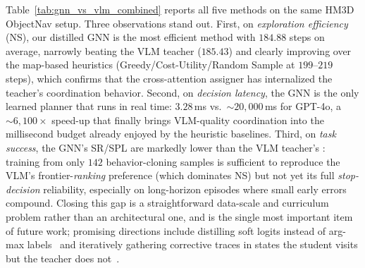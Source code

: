 Table~\ref{tab:gnn_vs_vlm_combined} reports all five methods on the same HM3D ObjectNav setup. Three observations stand out. First, on \emph{exploration efficiency} (NS), our distilled GNN is the most efficient method with $184.88$ steps on average, narrowly beating the VLM teacher ($185.43$) and clearly improving over the map-based heuristics (Greedy/Cost-Utility/Random Sample at $199$--$219$ steps), which confirms that the cross-attention assigner has internalized the teacher's coordination behavior. Second, on \emph{decision latency}, the GNN is the only learned planner that runs in real time: $3.28$\,ms vs.\ ${\sim}20{,}000$\,ms for GPT-4o, a ${\sim}6{,}100\times$ speed-up that finally brings VLM-quality coordination into the millisecond budget already enjoyed by the heuristic baselines. Third, on \emph{task success}, the GNN's SR/SPL are markedly lower than the VLM teacher's : training from only $142$ behavior-cloning samples is sufficient to reproduce the VLM's frontier-\emph{ranking} preference (which dominates NS) but not yet its full \emph{stop-decision} reliability, especially on long-horizon episodes where small early errors compound. Closing this gap is a straightforward data-scale and curriculum problem rather than an architectural one, and is the single most important item of future work; promising directions include distilling soft logits instead of arg-max labels~\cite{hinton2015distillation} and iteratively gathering corrective traces in states the student visits but the teacher does not~\cite{ross2011dagger}.







